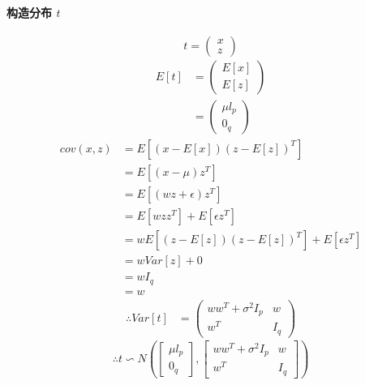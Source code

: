 \documentclass{report}
\begin{document}
\paragraph{构造分布 $t$\\}
$$
t = 
\left (
\begin{matrix}
x\\
z
\end{matrix}
\right )
$$
\begin{equation}
\begin{aligned}
E[t] &= 
\left (
\begin{matrix}
E[x]\\
E[z]
\end{matrix}
\right )\\
&=
\left (
\begin{matrix}
\mu l_p\\
0_q
\end{matrix}
\right )
\end{aligned}
\end{equation}
\begin{equation}
\begin{aligned}
cov(x,z)
&= E[(x - E[x])(z - E[z])^T]\\
&= E[(x - \mu)z^T]\\
&= E[(wz + \epsilon)z^T]\\
&= E[wzz^T] + E[\epsilon z^T]\\
&= w E[(z - E[z])(z - E[z])^T] + E[\epsilon z^T]\\
&= w Var[z] + 0\\
&= w I_q\\
&= w
\end{aligned}
\end{equation}
\begin{equation}
\begin{aligned}
\therefore 
Var[t] &= 
\left (
\begin{matrix}
ww^T + \sigma^2 I_p & w\\
w^T & I_q
\end{matrix}
\right )
\end{aligned}
\end{equation}
$$
\therefore 
t \backsim 
N(
\left [
\begin{matrix}
\mu l_p\\
0_q
\end{matrix}
\right ],
\left [
\begin{matrix}
ww^T + \sigma^2 I_p & w\\
w^T & I_q
\end{matrix}
\right ]
)
$$
\end{document}
